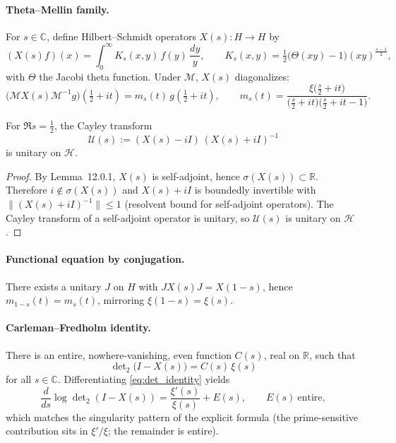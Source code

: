 \paragraph{Theta–Mellin family.}
For \(s\in\mathbb{C}\), define Hilbert–Schmidt operators \(X(s):H\to H\) by
\begin{equation}
(X(s)f)(x)=\int_0^\infty K_s(x,y)\,f(y)\,\frac{dy}{y},\qquad
K_s(x,y)=\tfrac12\big(\Theta(xy)-1\big)(xy)^{\frac{s-1}{2}},
\end{equation}
with \(\Theta\) the Jacobi theta function. Under \(\mathcal{M}\), \(X(s)\) diagonalizes:
\begin{equation}
\big(\mathcal{M}X(s)\mathcal{M}^{-1}g\big)\!\left(\tfrac12+it\right)=m_s(t)\,g\!\left(\tfrac12+it\right),\qquad
m_s(t)=\frac{\xi\!\big(\frac{s}{2}+it\big)}{\big(\frac{s}{2}+it\big)\big(\frac{s}{2}+it-1\big)}.
\end{equation}
\begin{corollary}\label{cor:cayley-unitarity}
For $\Re s=\tfrac12$, the Cayley transform
\[
\mathcal{U}(s) := (X(s)-iI)\,(X(s)+iI)^{-1}
\]
is unitary on $\mathcal H$.
\end{corollary}

\begin{proof}
By Lemma~12.0.1, $X(s)$ is self-adjoint, hence $\sigma(X(s))\subset\mathbb R$.
Therefore $i\notin \sigma(X(s))$ and $X(s)+iI$ is boundedly invertible with
$\|(X(s)+iI)^{-1}\|\le 1$ (resolvent bound for self-adjoint operators).
The Cayley transform of a self-adjoint operator is unitary, so
$\mathcal{U}(s)$ is unitary on $\mathcal H$.
\end{proof}

\paragraph{Functional equation by conjugation.}
There exists a unitary \(J\) on \(H\) with \(JX(s)J=X(1-s)\), hence \(m_{1-s}(t)=m_s(t)\), mirroring \(\xi(1-s)=\xi(s)\).

\paragraph{Carleman–Fredholm identity.}
There is an entire, nowhere-vanishing, even function \(C(s)\), real on \(\mathbb{R}\), such that
\begin{equation}
\boxed{\ \ \det\nolimits_{2}\!\big(I-X(s)\big)=C(s)\,\xi(s)\ \ }
\label{eq:det_identity}
\end{equation}
for all \(s\in\mathbb{C}\).
Differentiating \eqref{eq:det_identity} yields
\begin{equation}
\frac{d}{ds}\log\det\nolimits_{2}(I-X(s))
=\frac{\xi'(s)}{\xi(s)}+E(s),\qquad E(s)\ \text{entire},
\end{equation}
which matches the singularity pattern of the explicit formula (the prime-sensitive contribution sits in \(\xi'/\xi\); the remainder is entire).

